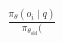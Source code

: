 \documentclass[preview]{standalone}
\begin{document}
\begin{align*}
\frac{\pi_\theta(o_i \mid q)}{\pi_{\theta_{\text{old}}}(}
\end{align*}
\end{document}
